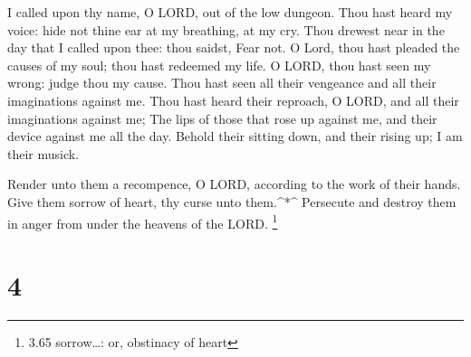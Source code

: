  I called upon thy name, O LORD, out of the low dungeon.
 Thou hast heard my voice: hide not thine ear at my
breathing, at my cry.  Thou drewest near in the day that I
called upon thee: thou saidst, Fear not.  O Lord, thou hast
pleaded the causes of my soul; thou hast redeemed my life. 
O LORD, thou hast seen my wrong: judge thou my cause.  Thou
hast seen all their vengeance and all their imaginations against me.
 Thou hast heard their reproach, O LORD, and all their
imaginations against me;  The lips of those that rose up
against me, and their device against me all the day. 
Behold their sitting down, and their rising up; I am their musick.

 Render unto them a recompence, O LORD, according to the
work of their hands.  Give them sorrow of heart, thy curse
unto them.\^{}*\^{}  Persecute and destroy them in anger
from under the heavens of the LORD. \footnote{3.65 sorrow\ldots: or,
  obstinacy of heart}

\hypertarget{section-3}{%
\section{4}\label{section-3}}

